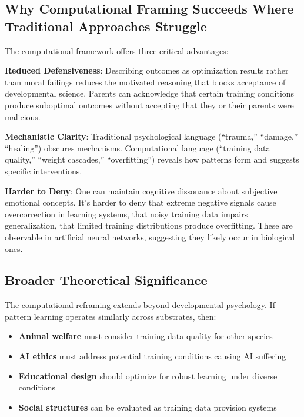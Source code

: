 \documentclass{article}
\begin{document}
\subsection{Why Computational Framing Succeeds Where Traditional Approaches Struggle}

The computational framework offers three critical advantages:

\textbf{Reduced Defensiveness}: Describing outcomes as optimization results rather than moral failings reduces the motivated reasoning that blocks acceptance of developmental science. Parents can acknowledge that certain training conditions produce suboptimal outcomes without accepting that they or their parents were malicious.

\textbf{Mechanistic Clarity}: Traditional psychological language (``trauma,'' ``damage,'' ``healing'') obscures mechanisms. Computational language (``training data quality,'' ``weight cascades,'' ``overfitting'') reveals how patterns form and suggests specific interventions.

\textbf{Harder to Deny}: One can maintain cognitive dissonance about subjective emotional concepts. It's harder to deny that extreme negative signals cause overcorrection in learning systems, that noisy training data impairs generalization, that limited training distributions produce overfitting. These are observable in artificial neural networks, suggesting they likely occur in biological ones.

\subsection{Broader Theoretical Significance}

The computational reframing extends beyond developmental psychology. If pattern learning operates similarly across substrates, then:

\begin{itemize}
\item \textbf{Animal welfare} must consider training data quality for other species
\item \textbf{AI ethics} must address potential training conditions causing AI suffering
\item \textbf{Educational design} should optimize for robust learning under diverse conditions
\item \textbf{Social structures} can be evaluated as training data provision systems
\end{itemize}
\end{document}
